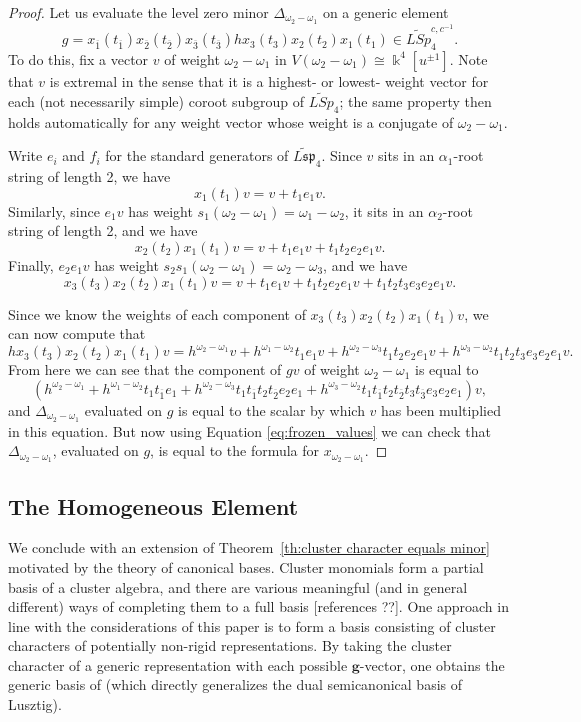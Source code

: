 \documentclass[12pt]{amsart}
\newcommand{\saySS}[1]{\say[SS]{\color{blue}{\bf SS:}\;#1}}
\newcommand{\kk}{\Bbbk}
\newcommand{\bfg}{\mathbf{g}}
\newcommand{\ol}[1]{\overline{#1}}
\newcommand{\loopvar}{u}
\theoremstyle{remark}
\numberwithin{equation}{section}
\numberwithin{figure}{section}
\begin{document}
\begin{proof}
  Let us evaluate the level zero minor $\Delta_{\omega_2 - \omega_1}$ on a generic element
  \[
    g = x_{\ol{1}}(t_{\ol{1}})x_{\ol{2}}(t_{\ol{2}})x_{\ol{3}}(t_{\ol{3}})hx_3(t_3)x_2(t_2)x_1(t_1) \in \widetilde{LSp}_4^{c,c^{-1}}.
  \]
  To do this, fix a vector $v$ of weight $\omega_2 - \omega_1$  in $V(\omega_2 - \omega_1) \cong \kk^4[\loopvar^{\pm 1}]$.
  Note that $v$ is extremal in the sense that it is a highest- or lowest- weight vector for each (not necessarily simple) coroot subgroup of $\widetilde{LSp}_4$; the same property then holds automatically for any weight vector whose weight is a conjugate of $\omega_2 - \omega_1$.

  Write $e_i$ and $f_i$ for the standard generators of $\widetilde{L\mathfrak{sp}}_4$.
  Since $v$ sits in an $\alpha_1$-root string of length 2, we have
  \[
    x_1(t_1)v = v + t_1e_1v.
  \]
  Similarly, since $e_1v$ has weight $s_1(\omega_2 - \omega_1) = \omega_1 - \omega_2$, it sits in an $\alpha_2$-root string of length 2, and we have
  \[
    x_2(t_2)x_1(t_1)v = v + t_1e_1v + t_1t_2e_2e_1v.
  \]
  Finally, $e_2e_1v$ has weight $s_2s_1(\omega_2 - \omega_1) = \omega_2 - \omega_3$, and we have
  \[
    x_3(t_3)x_2(t_2)x_1(t_1)v = v + t_1e_1v + t_1t_2e_2e_1v + t_1t_2t_3e_3e_2e_1v.
  \]

  Since we know the weights of each component of $x_3(t_3)x_2(t_2)x_1(t_1)v$, we can now compute that
  \[
    hx_3(t_3)x_2(t_2)x_1(t_1)v = h^{\omega_2-\omega_1}v + h^{\omega_1 - \omega_2}t_1e_1v + h^{\omega_2-\omega_3}t_1t_2e_2e_1v + h^{\omega_3-\omega_2}t_1t_2t_3e_3e_2e_1v.
  \]
  From here we can see that the component of $gv$ of weight $\omega_2 - \omega_1$ is equal to 
  \[
    (h^{\omega_2-\omega_1} + h^{\omega_1 - \omega_2}t_1t_{\ol{1}}e_1 + h^{\omega_2-\omega_3}t_1t_{\ol{1}}t_2t_{\ol{2}}e_2e_1 + h^{\omega_3-\omega_2}t_1t_{\ol{1}}t_2t_{\ol{2}}t_3t_{\ol{3}}e_3e_2e_1)v,
  \]
  and $\Delta_{\omega_2-\omega_1}$ evaluated on $g$ is equal to the scalar by which $v$ has been multiplied in this equation.
  But now using Equation \ref{eq:frozen_values} we can check that $\Delta_{\omega_2-\omega_1}$, evaluated on $g$, is equal to the formula for $x_{\omega_2 - \omega_1}$.
\end{proof}

\subsection{The Homogeneous Element}
We conclude with an extension of Theorem~\ref{th:cluster character equals minor} motivated by the theory of canonical bases.
Cluster monomials form a partial basis of a cluster algebra, and there are various meaningful (and in general different) ways of completing them to a full basis [references ??].
\saySS{Add references}
One approach in line with the considerations of this paper is to form a basis consisting of cluster characters of potentially non-rigid representations.
By taking the cluster character of a generic representation with each possible $\bfg$-vector, one obtains the generic basis of \cite{Dup12} (which directly generalizes the dual semicanonical basis of Lusztig).
\end{document}
